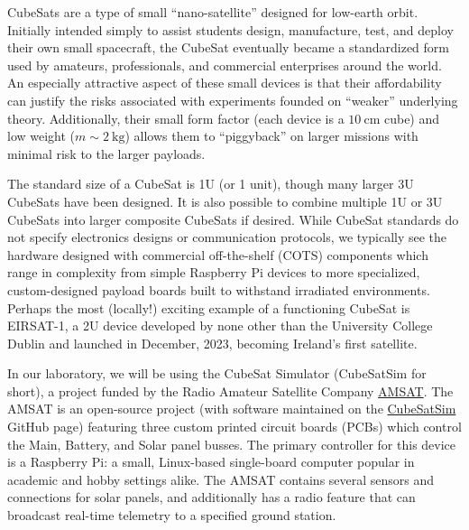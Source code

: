 \documentclass{tufte-book}
\begin{document}

CubeSats are a type of small ``nano-satellite'' designed for low-earth orbit. Initially intended simply to assist students design, manufacture, test, and deploy their own small spacecraft, the CubeSat eventually became a standardized form used by amateurs, professionals, and commercial enterprises around the world. An especially attractive aspect of these small devices is that their affordability can justify the risks associated with experiments founded on ``weaker'' underlying theory. Additionally, their small form factor (each device is a $10~\mathrm{cm}$ cube) and low weight ($m \sim 2~\mathrm{kg}$) allows them to ``piggyback'' on larger missions with minimal risk to the larger payloads. 

The standard size of a CubeSat is 1U (or 1 unit), though many larger 3U CubeSats have been designed. It is also possible to combine multiple 1U or 3U CubeSats into larger composite CubeSats if desired. While CubeSat standards do not specify electronics designs or communication protocols, we typically see the hardware designed with commercial off-the-shelf (COTS) components which range in complexity from simple Raspberry Pi devices to more specialized, custom-designed payload boards built to withstand irradiated environments. Perhaps the most (locally!) exciting example of a functioning CubeSat is EIRSAT-1, a 2U device developed by none other than the University College Dublin and launched in December, 2023, becoming Ireland's first satellite.

In our laboratory, we will be using the CubeSat Simulator (CubeSatSim for short), a project funded by the Radio Amateur Satellite Company \href{https://www.amsat.org/}{AMSAT}. The AMSAT is an open-source project (with software maintained on the \href{https://github.com/alanbjohnston/CubeSatSim}{CubeSatSim} GitHub page) featuring three custom printed circuit boards (PCBs) which control the Main, Battery, and Solar panel busses. The primary controller for this device is a Raspberry Pi: a small, Linux-based single-board computer popular in academic and hobby settings alike. The AMSAT contains several sensors and connections for solar panels, and additionally has a radio feature that can broadcast real-time telemetry to a specified ground station.
\end{document}
